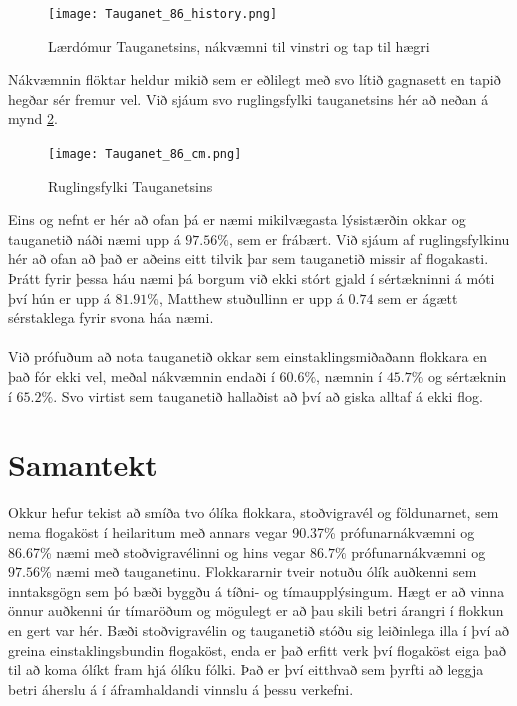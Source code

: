 \documentclass[11pt]{article}
\begin{document}
\begin{figure}[H]
    \centering
    \texttt{[image: Tauganet\_86\_history.png]}
    \caption{Lærdómur Tauganetsins, nákvæmni til vinstri og tap til hægri}
    \label{Tauganet_history}
\end{figure}

Nákvæmnin flöktar heldur mikið sem er eðlilegt með svo lítið gagnasett en tapið hegðar sér fremur vel. Við sjáum svo ruglingsfylki tauganetsins hér að neðan á mynd \ref{Tauganet_cm}.

\begin{figure}[H]
    \centering
    \texttt{[image: Tauganet\_86\_cm.png]}
    \caption{Ruglingsfylki Tauganetsins}
    \label{Tauganet_cm}
\end{figure}

Eins og nefnt er hér að ofan þá er næmi mikilvægasta lýsistærðin okkar og tauganetið náði næmi upp á $97.56\%$, sem er frábært. Við sjáum af ruglingsfylkinu hér að ofan að það er aðeins eitt tilvik þar sem tauganetið missir af flogakasti. Þrátt fyrir þessa háu næmi þá borgum við ekki stórt gjald í sértækninni á móti því hún er upp á $81.91\%$, Matthew stuðullinn er upp á $0.74$ sem er ágætt sérstaklega fyrir svona háa næmi. \\
\\

Við prófuðum að nota tauganetið okkar sem einstaklingsmiðaðann flokkara en það fór ekki vel, meðal nákvæmnin endaði í $60.6\%$, næmnin í $45.7\%$ og sértæknin í $65.2\%$. Svo virtist sem tauganetið hallaðist að því að giska alltaf á ekki flog. 
\section{Samantekt}
Okkur hefur tekist að smíða tvo ólíka flokkara, stoðvigravél og földunarnet, sem nema flogaköst í heilaritum með annars vegar 90.37\% prófunarnákvæmni og 86.67\% næmi með stoðvigravélinni og hins vegar $86.7\%$ prófunarnákvæmni og $97.56\%$ næmi með tauganetinu. Flokkararnir tveir notuðu ólík auðkenni sem inntaksgögn sem þó bæði byggðu á tíðni- og tímaupplýsingum. Hægt er að vinna önnur auðkenni úr tímaröðum og mögulegt er að þau skili betri árangri í flokkun en gert var hér. Bæði stoðvigravélin og tauganetið stóðu sig leiðinlega illa í því að greina einstaklingsbundin flogaköst, enda er það erfitt verk því flogaköst eiga það til að koma ólíkt fram hjá ólíku fólki. Það er því eitthvað sem þyrfti að leggja betri áherslu á í áframhaldandi vinnslu á þessu verkefni.


\end{document}
